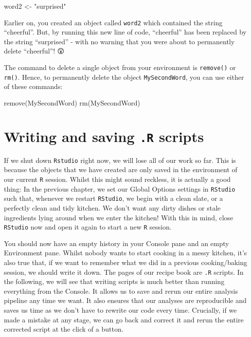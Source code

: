 \documentclass[
  letterpaper,
  DIV=11,
  numbers=noendperiod,
  oneside]{scrreprt}
\newenvironment{Shaded}{\begin{snugshade}}{\end{snugshade}}
\newcommand{\FunctionTok}[1]{\textcolor[rgb]{0.28,0.35,0.67}{#1}}
\newcommand{\NormalTok}[1]{\textcolor[rgb]{0.00,0.23,0.31}{#1}}
\newcommand{\OtherTok}[1]{\textcolor[rgb]{0.00,0.23,0.31}{#1}}
\newcommand{\StringTok}[1]{\textcolor[rgb]{0.13,0.47,0.30}{#1}}
\begin{document}
\begin{Shaded}
\begin{Highlighting}[]
\NormalTok{word2 }\OtherTok{\textless{}{-}} \StringTok{"surprised"}
\end{Highlighting}
\end{Shaded}

Earlier on, you created an object called \texttt{word2} which contained
the string ``cheerful''. But, by running this new line of code,
``cheerful'' has been replaced by the string ``surprised'' - with no
warning that you were about to permanently delete ``cheerful''! 😲

The command to delete a single object from your environment is
\texttt{remove()} or \texttt{rm()}. Hence, to permanently delete the
object \texttt{MySecondWord}, you can use either of these commands:

\begin{Shaded}
\begin{Highlighting}[]
\FunctionTok{remove}\NormalTok{(MySecondWord)}
\FunctionTok{rm}\NormalTok{(MySecondWord)}
\end{Highlighting}
\end{Shaded}

\section{\texorpdfstring{Writing and saving \texttt{.R}
scripts}{Writing and saving .R scripts}}\label{writing-and-saving-.r-scripts}

If we shut down \texttt{Rstudio} right now, we will lose all of our work
so far. This is because the objects that we have created are only saved
in the environment of our current \texttt{R} session. Whilst this might
sound reckless, it is actually a good thing: In the previous chapter, we
set our Global Options settings in \texttt{RStudio} such that, whenever
we restart \texttt{RStudio}, we begin with a clean slate, or a perfectly
clean and tidy kitchen. We don't want any dirty dishes or stale
ingredients lying around when we enter the kitchen! With this in mind,
close \texttt{RStudio} now and open it again to start a new \texttt{R}
session.

You should now have an empty history in your Console pane and an empty
Environment pane. Whilst nobody wants to start cooking in a messy
kitchen, it's also true that, if we want to remember what we did in a
previous cooking/baking session, we should write it down. The pages of
our recipe book are \texttt{.R} scripts. In the following, we will see
that writing scripts is much better than running everything from the
Console. It allows us to save and rerun our entire analysis pipeline any
time we want. It also ensures that our analyses are reproducible and
saves us time as we don't have to rewrite our code every time.
Crucially, if we made a mistake at any stage, we can go back and correct
it and rerun the entire corrected script at the click of a button.
\end{document}
